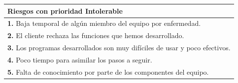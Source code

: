 \documentclass[spanish,a4paper,11pt, twoside]{report}	%
\begin{document}
			\begin{tabular}{|p{12cm}|}
				\hline
				\textbf{Riesgos con prioridad Intolerable}\\ \hline \hline
				\textbf{1.} Baja temporal de algún miembro del equipo por enfermedad.\\ \hline 
				\textbf{2.} El cliente rechaza las funciones que hemos desarrollado.\\ \hline
				\textbf{3.} Los programas desarrollados son muy difíciles de usar y poco efectivos. \\ \hline
				\textbf{4.} Poco tiempo para asimilar los pasos a seguir. \\ \hline
				\textbf{5.} Falta de conocimiento por parte de los componentes del equipo.\\ \hline
			\end{tabular}
			
				\ \\
				\ \\
			
\end{document}
